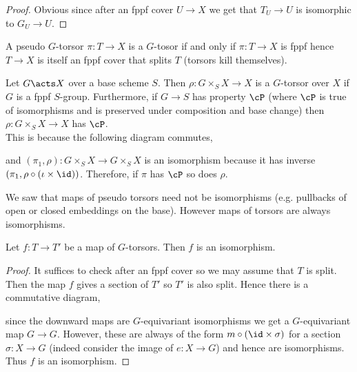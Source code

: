 \documentclass[12pt]{article}
\begin{document}
\begin{proof}
Obvious since after an fppf cover $U \to X$ we get that $T_U \to U$ is isomorphic to $G_U \to U$.
\end{proof}

\begin{cor}
A pseudo $G$-torsor $\pi : T \to X$ is a $G$-tosor if and only if $\pi : T \to X$ is fppf hence $T \to X$ is itself an fppf cover that splits $T$ (torsors kill themselves).
\end{cor}

\begin{example}
Let $G \acts X$ over a base scheme $S$. Then $\rho : G \times_S X \to X$ is a $G$-torsor over $X$ if $G$ is a fppf $S$-group. Furthermore, if $G \to S$ has property $\cP$ (where $\cP$ is true of isomorphisms and is preserved under composition and base change) then $\rho : G \times_S X \to X$ has $\cP$.
\bigskip\\
This is because the following diagram commutes,
\begin{center}
\end{center}
and $(\pi_1, \rho) : G \times_S X \to G \times_S X$ is an isomorphism because it has inverse $(\pi_1, \rho \circ (\iota \times \id))$. Therefore, if $\pi$ has $\cP$ so does $\rho$.
\end{example}

We saw that maps of pseudo torsors need not be isomorphisms (e.g. pullbacks of open or closed embeddings on the base). However maps of torsors are always isomorphisms.

\begin{prop}
Let $f : T \to T'$ be a map of $G$-torsors. Then $f$ is an isomorphism.
\end{prop}

\begin{proof}
It suffices to check after an fppf cover so we may assume that $T$ is split. Then the map $f$ gives a section of $T'$ so $T'$ is also split. Hence there is a commutative diagram,
\begin{center}
\end{center}
since the downward maps are $G$-equivariant isomorphisms we get a $G$-equivariant map $G \to G$. However, these are always of the form $m \circ (\id \times \sigma)$ for a section $\sigma : X \to G$ (indeed consider the image of $e : X \to G$) and hence are isomorphisms. Thus $f$ is an isomorphism.
\end{proof}
\end{document}
